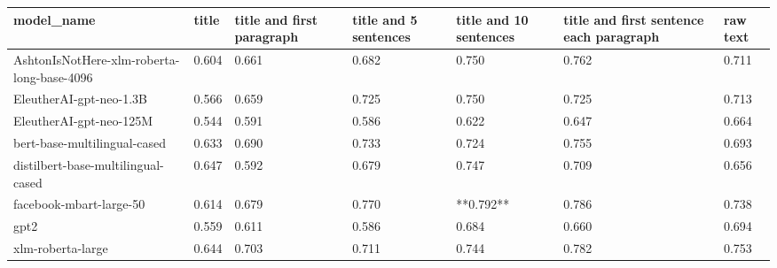 \begin{tabular}{lllllll}
\toprule
                                model\_name & title & title and first paragraph & title and 5 sentences & title and 10 sentences & title and first sentence each paragraph & raw text \\
\midrule
AshtonIsNotHere-xlm-roberta-long-base-4096 & 0.604 &                     0.661 &                 0.682 &                  0.750 &                                   0.762 &    0.711 \\
                   EleutherAI-gpt-neo-1.3B & 0.566 &                     0.659 &                 0.725 &                  0.750 &                                   0.725 &    0.713 \\
                   EleutherAI-gpt-neo-125M & 0.544 &                     0.591 &                 0.586 &                  0.622 &                                   0.647 &    0.664 \\
              bert-base-multilingual-cased & 0.633 &                     0.690 &                 0.733 &                  0.724 &                                   0.755 &    0.693 \\
        distilbert-base-multilingual-cased & 0.647 &                     0.592 &                 0.679 &                  0.747 &                                   0.709 &    0.656 \\
                   facebook-mbart-large-50 & 0.614 &                     0.679 &                 0.770 &              **0.792** &                                   0.786 &    0.738 \\
                                      gpt2 & 0.559 &                     0.611 &                 0.586 &                  0.684 &                                   0.660 &    0.694 \\
                         xlm-roberta-large & 0.644 &                     0.703 &                 0.711 &                  0.744 &                                   0.782 &    0.753 \\
\bottomrule
\end{tabular}

